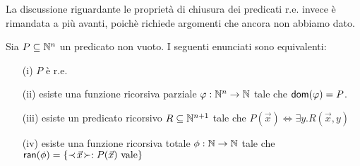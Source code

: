 \documentclass[runningheads,a4paper]{llncs}
\begin{document}
La discussione riguardante le propriet\`{a} di chiusura dei predicati r.e. invece \`{e} rimandata a pi\`{u} avanti, poich\`{e}
 richiede argomenti che ancora non abbiamo dato.

\begin{theorem}\label{thm:characterize-r.e.}
Sia $P \subseteq \mathbb{N}^n$ un predicato non vuoto. I seguenti enunciati sono equivalenti:
\begin{itemize}
\item[(i)] $P$ \`{e} r.e.
\item[(ii)] esiste una funzione ricorsiva parziale $\varphi: \mathbb{N}^n \to \mathbb{N}$ tale che $\mathsf{dom}(\varphi) = P$.
\item[(iii)] esiste un predicato ricorsivo $R \subseteq \mathbb{N}^{n+1}$ tale che $P(\vec x) \Leftrightarrow \exists y.R(\vec x,y)$
\item[(iv)] esiste una funzione ricorsiva totale $\phi: \mathbb{N} \to \mathbb{N}$ tale che\\ $\mathsf{ran}(\phi) = \{\prec\! \vec x \!\succ : P(\vec x) \mbox{ vale} \}$
\end{itemize}
\end{theorem}
\end{document}
